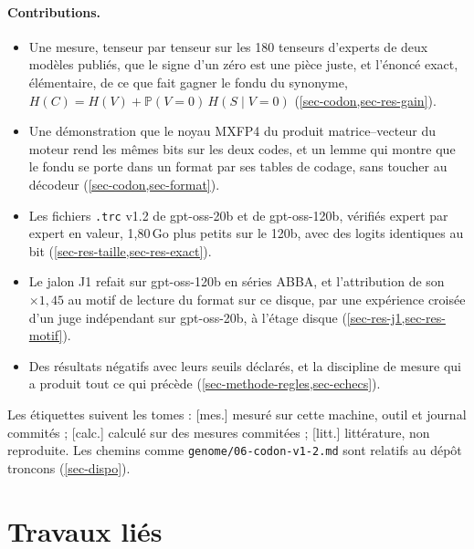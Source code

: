 \documentclass[11pt, a4paper]{article}
\theoremstyle{remark}
\newcommand{\etiq}[1]{\textsf{\scriptsize[#1]}}
\newcommand{\mes}{\etiq{mes.}}
\newcommand{\calc}{\etiq{calc.}}
\newcommand{\litt}{\etiq{litt.}}
\newcommand{\fichier}[1]{\textsf{\footnotesize\nolinkurl{#1}}}
\newcommand{\Prob}{\mathbb{P}}
\begin{document}
\paragraph{Contributions.}
\begin{itemize}
\item Une mesure, tenseur par tenseur sur les 180 tenseurs d'experts de deux modèles publiés, que le signe d'un zéro est une pièce juste, et l'énoncé exact, élémentaire, de ce que fait gagner le fondu du synonyme, $H(C) = H(V) + \Prob(V = 0)\,H(S \mid V = 0)$ (\cref{sec-codon,sec-res-gain}).
\item Une démonstration que le noyau MXFP4 du produit matrice--vecteur du moteur rend les mêmes bits sur les deux codes, et un lemme qui montre que le fondu se porte dans un format par ses tables de codage, sans toucher au décodeur (\cref{sec-codon,sec-format}).
\item Les fichiers \texttt{.trc} v1.2 de gpt-oss-20b et de gpt-oss-120b, vérifiés expert par expert en valeur, 1,80\,Go plus petits sur le 120b, avec des logits identiques au bit (\cref{sec-res-taille,sec-res-exact}).
\item Le jalon J1 refait sur gpt-oss-120b en séries ABBA, et l'attribution de son $\times 1{,}45$ au motif de lecture du format sur ce disque, par une expérience croisée d'un juge indépendant sur gpt-oss-20b, à l'étage disque (\cref{sec-res-j1,sec-res-motif}).
\item Des résultats négatifs avec leurs seuils déclarés, et la discipline de mesure qui a produit tout ce qui précède (\cref{sec-methode-regles,sec-echecs}).
\end{itemize}

Les étiquettes suivent les tomes : \mes{} mesuré sur cette machine, outil et journal commités ; \calc{} calculé sur des mesures commitées ; \litt{} littérature, non reproduite. Les chemins comme \fichier{genome/06-codon-v1-2.md} sont relatifs au dépôt troncons (\cref{sec-dispo}).

\section{Travaux liés}\label{sec-travaux}
\end{document}
